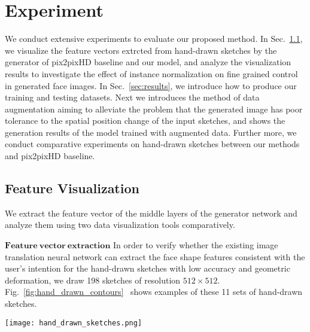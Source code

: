 \documentclass[10pt,twocolumn,letterpaper]{article}
\begin{document}
\section{Experiment}
We conduct extensive experiments to evaluate our proposed method.
In Sec.~\ref{sec:visualize}, we visualize the feature vectors extrcted from hand-drawn sketches by the generator of pix2pixHD baseline and our model, and analyze the visualization results to investigate the effect of instance normalization on fine grained control in generated face images.
In Sec.~\ref{sec:results}, we introduce how to produce our training and testing datasets. Next we introduces the method of data augmentation aiming to alleviate the problem that the generated image has poor tolerance to the spatial position change of the input sketches, and shows the generation results of the model trained with augmented data. Further more, we conduct comparative experiments on hand-drawn sketches between our methods and pix2pixHD baseline.

\subsection{Feature Visualization}\label{sec:visualize}
We extract the feature vector of the middle layers of the generator network and analyze them using two data visualization tools comparatively.

\noindent
$\mathbf{Feature ~vector ~extraction}$ In order to verify whether the existing image translation neural network can extract the face shape features consistent with the user's intention for the hand-drawn sketches with low accuracy and geometric deformation, we draw 198 sketches of resolution $512\times512$. Fig.~\ref{fig:hand_drawn_contours}~ shows examples of these 11 sets of hand-drawn sketches.  
\begin{figure*}[htbp]
	\centering
	\texttt{[image: hand\_drawn\_sketches.png]}
	\caption{These sketches can be divided into 11 categories. G1:Add hair; G2:Add new attributes, such as whiskers, wrinkles, ears; G3:Change face shape; G4:Change eyebrows; G5:Change eye shape; G6:changes eye size; G7:Graffiti-drawn; G8:Change mouth; G9:Change nose; G10:Change mouth(same eyes as G9); G11:Change nose(same eyes as G8). Specifically, there is no correlation between G7 and the other 10 classes. Except G7, the sketch only changes a particular location or property while the rest of the sketch remains the same. Except for the same eye between G8 and G11, G9 and G10, the eye lines of other categories of sketches are different.}
	\label{fig:hand_drawn_contours}
\end{figure*}
\end{document}
